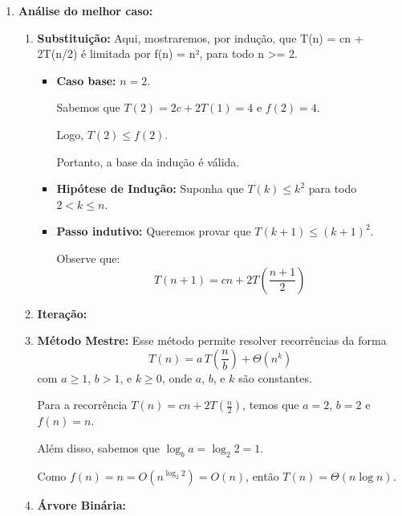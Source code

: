 \begin{enumerate}
    \item \textbf{Análise do melhor caso:}
        \begin{enumerate}
            \item \textbf{Substituição:}
            Aqui, mostraremos, por indução, que T(n) = cn + 2T(n/2) é limitada por f(n) = n², para todo n >= 2.
            \begin{itemize}
            \item \textbf{Caso base:} \( n = 2 \).
            
            Sabemos que \( T(2) = 2c + 2T(1) = 4 \) e \( f(2) = 4 \).
            
            Logo, \( T(2) \leq f(2) \).
            
            Portanto, a base da indução é válida.
            
            \item \textbf{Hipótese de Indução:} Suponha que \( T(k) \leq k^2 \) para todo \( 2 < k \leq n \).
            
            \item \textbf{Passo indutivo:} Queremos provar que \( T(k+1) \leq (k+1)^2 \).
            
            Observe que:
              \[
              T(n+1) = cn + 2T\left(\frac{n+1}{2}\right)
              \]
              
            \end{itemize}
            

            
            \item \textbf{Iteração:}
            
            
            
            \item \textbf{Método Mestre:}
              Esse método permite resolver recorrências da forma 
              \[
              T(n) = a \, T\left(\frac{n}{b}\right) + \Theta(n^k)
              \]
              com \( a \geq 1 \), \( b > 1 \), e \( k \geq 0 \), onde \( a \), \( b \), e \( k \) são constantes.
        
              Para a recorrência \( T(n) = cn + 2T\left(\frac{n}{2}\right) \), temos que \( a = 2 \), \( b = 2 \) e \( f(n) = n \).
        
              Além disso, sabemos que \( \log_b a = \log_2 2 = 1 \).
        
              Como \( f(n) = n = O(n^{\log_2 2}) = O(n) \), então \( T(n) = \Theta(n \log n) \).

            
            
            \item \textbf{Árvore Binária:}
            
        
        \end{enumerate}    

\end{enumerate}